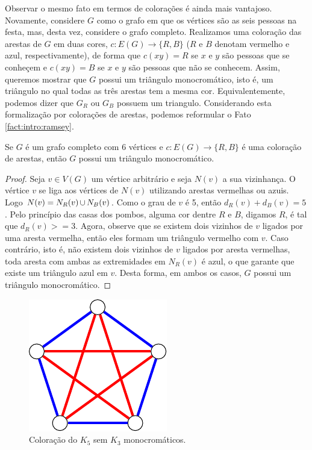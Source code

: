 Observar o mesmo fato em termos de colorações é ainda mais vantajoso. Novamente, considere $G$ como o grafo em que os vértices são as seis pessoas na festa, mas, desta vez, considere o grafo completo. Realizamos uma coloração das arestas de $G$ em duas cores, $c: E(G) \to \{ R,B \}$ ($R$ e $B$ denotam vermelho e azul, respectivamente), de forma que $c(xy) = R$ se $x$ e $y$ são pessoas que se conheçem e $c(xy) = B$ se $x$ e $y$ são pessoas que não se conhecem. Assim, queremos mostrar que $G$ possui um triângulo monocromático, isto é, um triângulo no qual todas as três arestas tem a mesma cor. Equivalentemente, podemos dizer que $G_R$ ou $G_B$ possuem um triangulo. Considerando esta formalização por colorações de arestas, podemos reformular o Fato \ref{fact:intro:ramsey}.

\begin{proposition}
\label{thm:intro:r33}
Se $G$ é um grafo completo com 6 vértices e $c: E(G) \to \{ R,B\}$ é uma coloração de arestas, então $G$ possui um triângulo monocromático.
\end{proposition}
\begin{proof}
Seja $v \in V(G)$ um vértice arbitrário e seja $N(v)$ a sua vizinhança. O vértice $v$ se liga aos vértices de $N(v)$ utilizando arestas vermelhas ou azuis. Logo $N(v) = N_R(v) \operatorname{\cup} N_B(v)$. Como o grau de $v$ é 5, então $d_R(v) + d_B(v) = 5$. Pelo princípio das casas dos pombos, alguma cor dentre $R$ e $B$, digamos $R$, é tal que $d_R(v) >= 3$. Agora, observe que se existem dois vizinhos de $v$ ligados por uma aresta vermelha, então eles formam um triângulo vermelho com $v$. Caso contrário, isto é, não existem dois vizinhos de $v$ ligados por aresta vermelhas, toda aresta com ambas as extremidades em $N_R(v)$ é azul, o que garante que existe um triângulo azul em $v$. Desta forma, em ambos os casos, $G$ possui um triângulo monocromático.
\end{proof}

\begin{figure}[ht!]
\centering
\includegraphics{figures/1_intro_5_pentagram}
\caption{Coloração do $K_5$ sem $K_3$ monocromáticos.}
\label{fig:intro:r33lb}
\end{figure}

